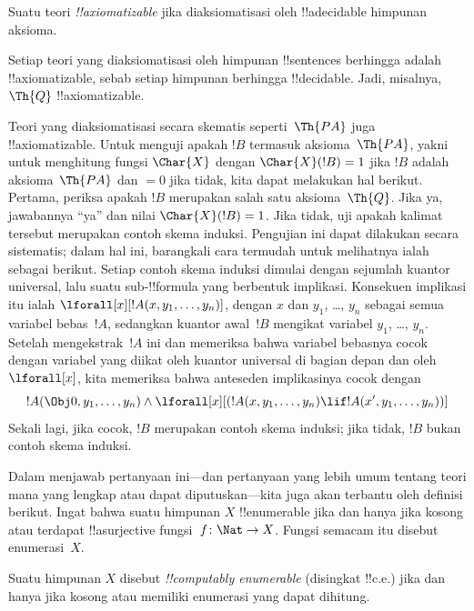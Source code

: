 \documentclass[../../../include/open-logic-section]{subfiles}
\begin{document}
\begin{defn}
Suatu teori \emph{!!{axiomatizable}} jika diaksiomatisasi oleh
!!a{decidable} himpunan aksioma.
\end{defn}

\begin{ex}
Setiap teori yang diaksiomatisasi oleh himpunan !!{sentence}s berhingga adalah
!!{axiomatizable}, sebab setiap himpunan berhingga !!{decidable}. Jadi,
misalnya, $\Th{Q}$ !!{axiomatizable}.

Teori yang diaksiomatisasi secara skematis seperti~$\Th{PA}$ juga
!!{axiomatizable}. Untuk menguji apakah $!B$ termasuk aksioma~$\Th{PA}$,
yakni untuk menghitung fungsi $\Char{X}$ dengan $\Char{X}(!B) = 1$ jika $!B$
adalah aksioma~$\Th{PA}$ dan $= 0$ jika tidak, kita dapat melakukan hal
berikut. Pertama, periksa apakah $!B$ merupakan salah satu aksioma~$\Th{Q}$.
Jika ya, jawabannya ``ya'' dan nilai $\Char{X}(!B) = 1$. Jika tidak, uji apakah
kalimat tersebut merupakan contoh skema induksi. Pengujian ini dapat dilakukan secara
sistematis; dalam hal ini, barangkali cara termudah untuk melihatnya ialah
sebagai berikut. Setiap contoh skema induksi dimulai dengan sejumlah kuantor
universal, lalu suatu sub-!!{formula} yang berbentuk implikasi. Konsekuen
implikasi itu ialah $\lforall[x][!A(x, y_1, \dots, y_n)]$, dengan $x$ dan $y_1$,
\dots, $y_n$ sebagai semua variabel bebas~$!A$, sedangkan kuantor awal~$!B$
mengikat variabel $y_1$, \dots, $y_n$. Setelah mengekstrak~$!A$ ini dan
memeriksa bahwa variabel bebasnya cocok dengan variabel yang diikat oleh
kuantor universal di bagian depan dan oleh~$\lforall[x]$, kita memeriksa
bahwa anteseden implikasinya cocok dengan
\[
!A(\Obj 0, y_1, \dots, y_n) \land \lforall[x][(!A(x, y_1, \dots, y_n)
\lif !A(x', y_1, \dots, y_n))]
\]
Sekali lagi, jika cocok, $!B$ merupakan contoh skema induksi; jika tidak,
$!B$ bukan contoh skema induksi.
\end{ex}

Dalam menjawab pertanyaan ini---dan pertanyaan yang lebih umum tentang teori
mana yang lengkap atau dapat diputuskan---kita juga akan terbantu oleh
definisi berikut. Ingat bahwa suatu himpunan $X$ !!{enumerable} jika dan hanya
jika kosong atau terdapat !!a{surjective} fungsi~$f \colon \Nat \to X$.
Fungsi semacam itu disebut enumerasi~$X$.

\begin{defn}
Suatu himpunan $X$ disebut \emph{!!{computably enumerable}} (disingkat
!!{c.e.}) jika dan hanya jika kosong atau memiliki enumerasi yang dapat
dihitung.
\end{defn}
\end{document}
